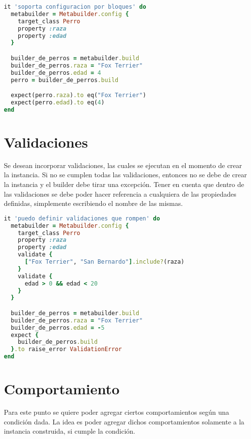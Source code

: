 \documentclass[spanish,a4paper]{article}
\begin{document}
  \begin{lstlisting}[language=Ruby]
it 'soporta configuracion por bloques' do
  metabuilder = Metabuilder.config {
    target_class Perro
    property :raza
    property :edad
  }

  builder_de_perros = metabuilder.build
  builder_de_perros.raza = "Fox Terrier"
  builder_de_perros.edad = 4
  perro = builder_de_perros.build

  expect(perro.raza).to eq("Fox Terrier")
  expect(perro.edad).to eq(4)
end
  \end{lstlisting}

\section{Validaciones}

Se desean incorporar validaciones, las cuales se ejecutan en el momento de crear la instancia. Si no se cumplen todas las validaciones, entonces no se debe de crear la instancia y el builder debe tirar una excepción.
Tener en cuenta que dentro de las validaciones se debe poder hacer referencia a cualquiera de las propiedades definidas, simplemente escribiendo el nombre de las mismas.

  \begin{lstlisting}[language=Ruby]
it 'puedo definir validaciones que rompen' do
  metabuilder = Metabuilder.config {
    target_class Perro
    property :raza
    property :edad
    validate {
      ["Fox Terrier", "San Bernardo"].include?(raza)
    }
    validate {
      edad > 0 && edad < 20
    }
  }

  builder_de_perros = metabuilder.build
  builder_de_perros.raza = "Fox Terrier"
  builder_de_perros.edad = -5
  expect {
    builder_de_perros.build
  }.to raise_error ValidationError
end
  \end{lstlisting}

\section{Comportamiento}

Para este punto se quiere poder agregar ciertos comportamientos según una condición dada. La idea es poder agregar dichos comportamientos solamente a la instancia construida, si cumple la condición.
\end{document}
